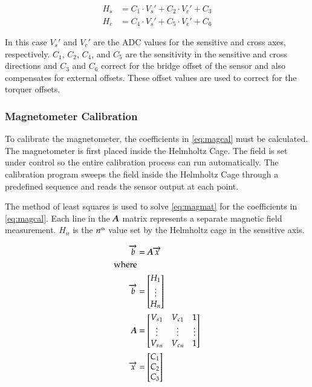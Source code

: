 \begin{equation}
    \label{eq:magcal}
    \begin{split}
        H_s &= C_1 \cdot V_s' + C_2 \cdot V_c' + C_3\\
        H_c &= C_4 \cdot V_s' + C_5 \cdot V_c' + C_6
    \end{split}
\end{equation}

In this case $V_s'$ and $V_c'$ are the \ac{ADC} values for the sensitive and cross axes, respectively. $C_1$, $C_2$, $C_4$, and $C_5$ are the sensitivity in the sensitive and cross directions and $C_3$ and $C_6$ correct for the bridge offset of the sensor and also compensates for external offsets. These offset values are used to correct for the torquer offsets.

\subsubsection{Magnetometer Calibration}
\label{sec:magcal}

To calibrate the magnetometer, the coefficients in \cref{eq:magcal} must be calculated. The magnetometer is first placed inside the Helmholtz Cage. The field is set under \matlab control so the entire calibration process can run automatically. The calibration program sweeps the field inside the Helmholtz Cage through a predefined sequence and reads the sensor output at each point. 

The method of least squares is used to solve \cref{eq:magmat} for the coefficients in \cref{eq:magcal}. Each line in the $\boldsymbol{A}$ matrix represents a separate magnetic field measurement. $H_n$ is the $n^{\text{\tiny th}}$ value set by the Helmholtz cage in the sensitive axis. 

\begin{equation}
    \label{eq:magmat}
    \begin{split}
    \vect{b}&=\matt{A} \vect{x} \\
    {\text{\raggedright where}} \\
    \vect{b}&= 
    \begin{bmatrix}
        H_1 \\
        \vdots \\
        H_n \\
    \end{bmatrix} \\
    \matt{A}&=
    \begin{bmatrix}
        {V_s}_1 & {V_c}_1 & 1 \\
        \vdots & \vdots & \vdots\\
        {V_s}_n & {V_c}_n & 1 \\
    \end{bmatrix} \\
    \vect{x}&= 
    \begin{bmatrix}
        C_1 \\
        C_2 \\
        C_3 \\
    \end{bmatrix} 
    \end{split}
\end{equation}

